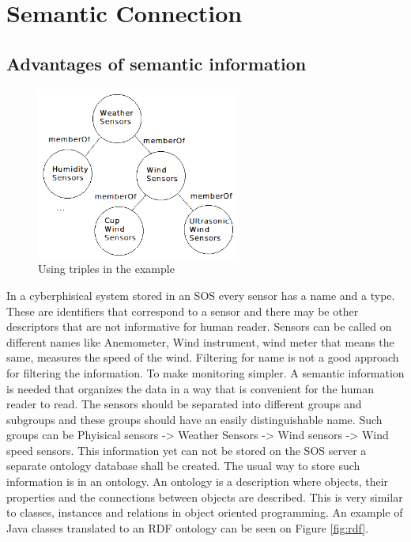 \chapter{Semantic Connection}

\section{Advantages of semantic information}

\begin{figure}[h]
\centering
\includegraphics[width=0.6\textwidth]{figures/semws.png}
\caption{Using triples in the example\label{fig:semws}}
\end{figure}

In a cyberphisical system stored in an SOS every sensor has a name and a type. These are identifiers that correspond to a sensor and there may be other descriptors that are not informative for human reader. Sensors can be called on different names like Anemometer, Wind instrument, wind meter that means the same, measures the speed of the wind. Filtering for name is not a good approach for filtering the information. To make monitoring simpler. A semantic information is needed that organizes the data in a way that is convenient for the human reader to read. The sensors should be separated into different groups and subgroups and these groups should have an easily distinguishable name. Such groups can be Phyisical sensors -> Weather Sensors -> Wind sensors -> Wind speed sensors. This information yet can not be stored on the SOS server a separate ontology database shall be created. 
The usual way to store such information is in an ontology. 
An ontology is a description where objects, their properties and the connections between objects are described. This is very similar to classes, instances and relations in object oriented programming. An example of Java classes translated to an RDF ontology can be seen on Figure \ref{fig:rdf}\cite{g2d4}.


